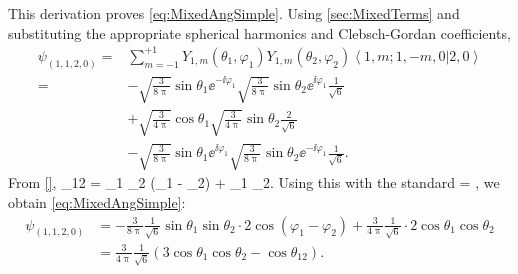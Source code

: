 \documentclass[Dissertation.tex]{subfiles}
\begin{document}
This derivation proves \cref{eq:MixedAngSimple}. Using \cref{sec:MixedTerms} and substituting the appropriate spherical harmonics and Clebsch-Gordan coefficients,
\begin{align}
\psi_{(1,1,2,0)} = &\sum_{m=-1}^{+1} Y_{1,m}(\theta_1,\varphi_1) Y_{1,m}(\theta_2,\varphi_2) \left< 1,m; 1,-m,0 | 2,0 \right> \nonumber \\
	= &-\sqrt{\frac{3}{8\uppi}} \sin\theta_1 \ee^{-\ii \varphi_1} \sqrt{\frac{3}{8\uppi}} \sin\theta_2 \ee^{\ii \varphi_1} \frac{1}{\sqrt{6}} \nonumber \\
	& + \sqrt{\frac{3}{4\uppi}} \cos\theta_1 \sqrt{\frac{3}{4\uppi}} \sin\theta_2 \frac{2}{\sqrt{6}} \nonumber \\
	& -\sqrt{\frac{3}{8\uppi}} \sin\theta_1 \ee^{\ii \varphi_1} \sqrt{\frac{3}{8\uppi}} \sin\theta_2 \ee^{-\ii \varphi_1} \frac{1}{\sqrt{6}}.
\end{align}
From \cref{},
\beq
\cos\theta_{12} = \sin\theta_1 \sin\theta_2 \cos(\varphi_1 - \varphi_2) + \cos\theta_1 \cos\theta_2.
\eeq
Using this with the standard
\beq
\cos\theta = ,
\eeq
we obtain \cref{eq:MixedAngSimple}:
\begin{align}
\psi_{(1,1,2,0)} &= -\frac{3}{8\uppi} \frac{1}{\sqrt{6}} \sin\theta_1 \sin\theta_2 \cdot 2 \cos(\varphi_1 - \varphi_2) + \frac{3}{4\uppi} \frac{1}{\sqrt{6}} \cdot 2 \cos\theta_1 \cos\theta_2 \nonumber \\
&= \frac{3}{4\uppi} \frac{1}{\sqrt{6}} \left(3 \cos\theta_1 \cos\theta_2 - \cos\theta_{12} \right).
\end{align}




\biblio
\end{document}
